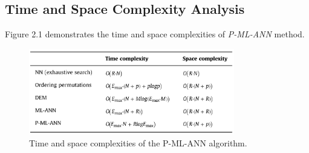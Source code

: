 \subsection{Time and Space Complexity Analysis}
Figure 2.1 demonstrates the time and space complexities of \textit{P-ML-ANN} method.
\begin{figure}[!h]\centering
	\includegraphics[width=0.8\textwidth]{complexities.PNG}
	\caption{Time and space complexities of the P-ML-ANN algorithm.}
	\label{pl1}
\end{figure}

